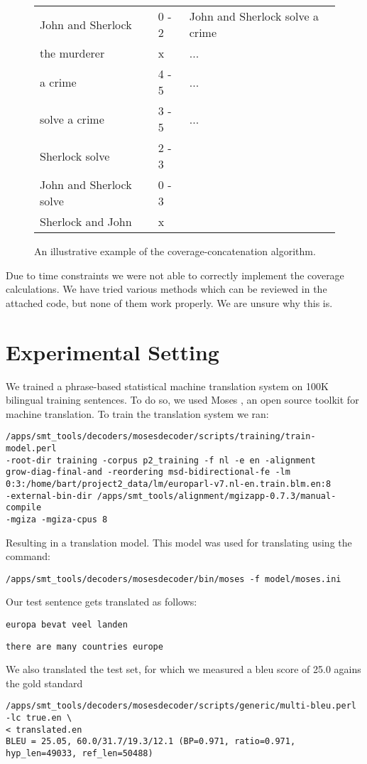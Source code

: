 \documentclass[11pt]{article}
\begin{document}
\begin{figure}
    \begin{tabular}{l|l|l}
    John and Sherlock       & 0 - 2 & John and Sherlock solve a crime \\
    the murderer            & x     & ...                             \\
    a crime                 & 4 - 5 & ...                             \\
    solve a crime           & 3 - 5 & ...                             \\
    Sherlock solve          & 2 - 3 & ~                               \\
    John and Sherlock solve & 0 - 3 & ~                               \\
    Sherlock and John       & x     & ~                               \\
    \end{tabular}
\caption{An illustrative example of the coverage-concatenation algorithm.}
    \label{algorithm}
\end{figure}

Due to time constraints we were not able to correctly implement the coverage calculations. We have tried various methods which can be reviewed in the attached code, but none of them work properly. We are unsure why this is.

\section{Experimental Setting}
\label{eval}
We trained a phrase-based statistical machine translation system on 100K bilingual training sentences. To do so, we used Moses \cite{moses}, an open source toolkit for machine translation. To train the translation system we ran: \begin{verbatim}/apps/smt_tools/decoders/mosesdecoder/scripts/training/train-model.perl 
-root-dir training -corpus p2_training -f nl -e en -alignment
grow-diag-final-and -reordering msd-bidirectional-fe -lm
0:3:/home/bart/project2_data/lm/europarl-v7.nl-en.train.blm.en:8
-external-bin-dir /apps/smt_tools/alignment/mgizapp-0.7.3/manual-compile
-mgiza -mgiza-cpus 8\end{verbatim} Resulting in a translation model. 
This model was used for translating using the command: \begin{verbatim}/apps/smt_tools/decoders/mosesdecoder/bin/moses -f model/moses.ini\end{verbatim} 
Our test sentence gets translated as follows:
\begin{verbatim}europa bevat veel landen\end{verbatim} 
\begin{verbatim}there are many countries europe\end{verbatim} 
We also translated the test set, for which we measured a bleu score of 25.0 agains the gold standard
\begin{verbatim}/apps/smt_tools/decoders/mosesdecoder/scripts/generic/multi-bleu.perl -lc true.en \
< translated.en
BLEU = 25.05, 60.0/31.7/19.3/12.1 (BP=0.971, ratio=0.971, hyp_len=49033, ref_len=50488)\end{verbatim} 
\end{document}

